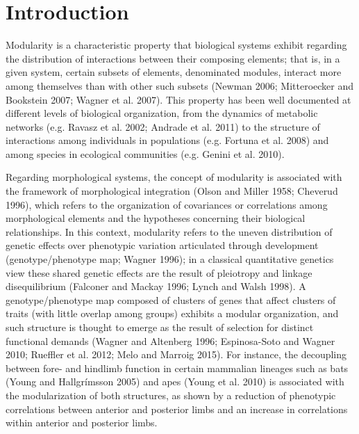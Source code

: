 \documentclass[12pt,]{article}
\begin{document}
\section{Introduction}\label{introduction}

Modularity is a characteristic property that biological systems exhibit
regarding the distribution of interactions between their composing
elements; that is, in a given system, certain subsets of elements,
denominated modules, interact more among themselves than with other such
subsets (Newman 2006; Mitteroecker and Bookstein 2007; Wagner et al.
2007). This property has been well documented at different levels of
biological organization, from the dynamics of metabolic networks (e.g.
Ravasz et al. 2002; Andrade et al. 2011) to the structure of
interactions among individuals in populations (e.g. Fortuna et al. 2008)
and among species in ecological communities (e.g. Genini et al. 2010).

Regarding morphological systems, the concept of modularity is associated
with the framework of morphological integration (Olson and Miller 1958;
Cheverud 1996), which refers to the organization of covariances or
correlations among morphological elements and the hypotheses concerning
their biological relationships. In this context, modularity refers to
the uneven distribution of genetic effects over phenotypic variation
articulated through development (genotype/phenotype map; Wagner 1996);
in a classical quantitative genetics view these shared genetic effects
are the result of pleiotropy and linkage disequilibrium (Falconer and
Mackay 1996; Lynch and Walsh 1998). A genotype/phenotype map composed of
clusters of genes that affect clusters of traits (with little overlap
among groups) exhibits a modular organization, and such structure is
thought to emerge as the result of selection for distinct functional
demands (Wagner and Altenberg 1996; Espinosa-Soto and Wagner 2010;
Rueffler et al. 2012; Melo and Marroig 2015). For instance, the
decoupling between fore- and hindlimb function in certain mammalian
lineages such as bats (Young and Hallgrímsson 2005) and apes (Young et
al. 2010) is associated with the modularization of both structures, as
shown by a reduction of phenotypic correlations between anterior and
posterior limbs and an increase in correlations within anterior and
posterior limbs.
\end{document}
